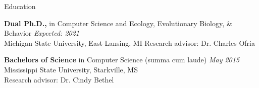\begin{rSection}{Education}

{\bf Dual Ph.D.,} in Computer Science and Ecology, Evolutionary Biology, \& Behavior \hfill {\em Expected: 2021} \\
Michigan State University, East Lansing, MI
Research advisor: Dr. Charles Ofria

{\bf Bachelors of Science} in Computer Science (summa cum laude) \hfill {\em May 2015} \\
Mississippi State University, Starkville, MS \\
Research advisor: Dr. Cindy Bethel

\end{rSection}